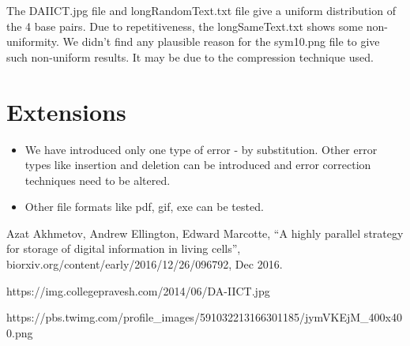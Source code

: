 \documentclass[11pt]{article}
\begin{document}
The DAIICT.jpg file and longRandomText.txt file give a uniform distribution of the 4 base pairs. Due to repetitiveness, the longSameText.txt shows some non-uniformity. We didn't find any plausible reason for the sym10.png file to give such non-uniform results. It may be due to the compression technique used.

\section{Extensions}

\begin{itemize}
    \item We have introduced only one type of error - by substitution. Other error types like insertion and deletion can be introduced and error correction techniques need to be altered.
    
    \item Other file formats like pdf, gif, exe can be tested.
    
\end{itemize}

\begin{thebibliography}{}
    
     Azat Akhmetov, Andrew Ellington, Edward Marcotte, “A highly parallel strategy for storage of digital information in living cells”, biorxiv.org/content/early/2016/12/26/096792, Dec 2016.
    
     https://img.collegepravesh.com/2014/06/DA-IICT.jpg
    
     https://pbs.twimg.com/profile\_images/591032213166301185/jymVKEjM\_400x400.png


\end{thebibliography}
\end{document}
